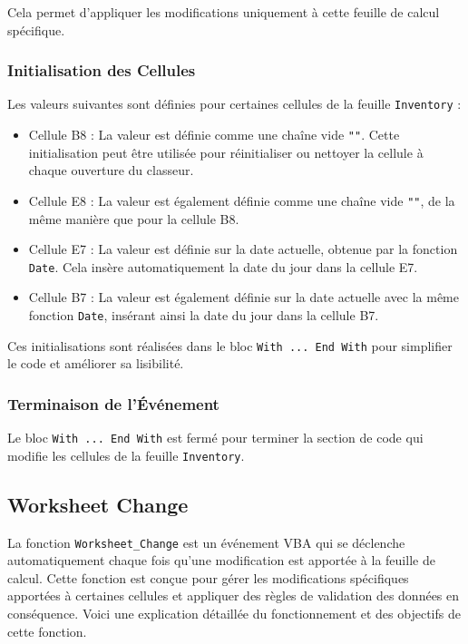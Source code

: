 \documentclass[a4paper, oneside, 12pt, final]{extreport}
\begin{document}
Cela permet d'appliquer les modifications uniquement à cette feuille de calcul spécifique.

\subsubsection{Initialisation des Cellules}

Les valeurs suivantes sont définies pour certaines cellules de la feuille \texttt{Inventory} :

\begin{itemize}
    \item Cellule B8 : La valeur est définie comme une chaîne vide \texttt{""}. Cette initialisation peut être utilisée pour réinitialiser ou nettoyer la cellule à chaque ouverture du classeur.
    \item Cellule E8 : La valeur est également définie comme une chaîne vide \texttt{""}, de la même manière que pour la cellule B8.
    \item Cellule E7 : La valeur est définie sur la date actuelle, obtenue par la fonction \texttt{Date}. Cela insère automatiquement la date du jour dans la cellule E7.
    \item Cellule B7 : La valeur est également définie sur la date actuelle avec la même fonction \texttt{Date}, insérant ainsi la date du jour dans la cellule B7.
\end{itemize}

Ces initialisations sont réalisées dans le bloc \texttt{With ... End With} pour simplifier le code et améliorer sa lisibilité.

\subsubsection{Terminaison de l'Événement}

Le bloc \texttt{With ... End With} est fermé pour terminer la section de code qui modifie les cellules de la feuille \texttt{Inventory}.
\subsection{Worksheet Change}

La fonction \texttt{Worksheet\_Change} est un événement VBA qui se déclenche automatiquement chaque fois qu'une modification est apportée à la feuille de calcul. Cette fonction est conçue pour gérer les modifications spécifiques apportées à certaines cellules et appliquer des règles de validation des données en conséquence. Voici une explication détaillée du fonctionnement et des objectifs de cette fonction.
\end{document}

